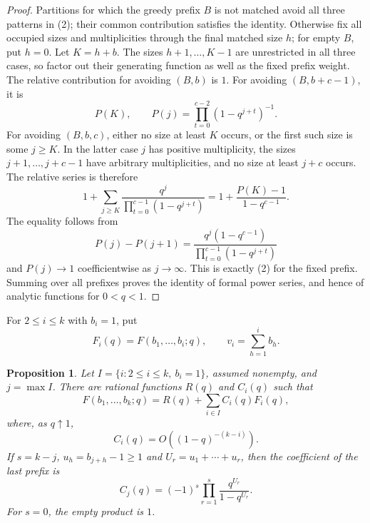\documentclass[11pt,a4paper]{article}
\numberwithin{equation}{section}
\newtheorem{proposition}[theorem]{Proposition}
\theoremstyle{definition}
\theoremstyle{remark}
\begin{document}
\begin{proof}
Partitions for which the greedy prefix $B$ is not matched avoid all
three patterns in (2); their common contribution satisfies the identity.
Otherwise fix all occupied sizes and multiplicities through the final
matched size $h$; for empty $B$, put $h=0$.  Let $K=h+b$.
The sizes $h+1,\ldots,K-1$ are unrestricted in all three cases, so
factor out their generating function as well as the fixed prefix weight.
The relative contribution for avoiding $(B,b)$ is $1$.
For avoiding $(B,b+c-1)$, it is
\[
 P(K),\qquad P(j)=\prod_{t=0}^{c-2}(1-q^{j+t})^{-1}.
\]
For avoiding $(B,b,c)$, either no size at least $K$ occurs, or the
first such size is some $j\ge K$.  In the latter case $j$ has positive
multiplicity, the sizes $j+1,\ldots,j+c-1$ have arbitrary
multiplicities, and no size at least $j+c$ occurs.  The relative series
is therefore
\[
 1+\sum_{j\ge K}
      \frac{q^j}{\prod_{t=0}^{c-1}(1-q^{j+t})}
 =1+\frac{P(K)-1}{1-q^{c-1}}.
\]
The equality follows from
\[
 P(j)-P(j+1)
   =\frac{q^j(1-q^{c-1})}
           {\prod_{t=0}^{c-1}(1-q^{j+t})}
\]
and $P(j)\to1$ coefficientwise as $j\to\infty$.
This is exactly (2) for the fixed prefix.  Summing over all prefixes
proves the identity of formal power series, and hence of analytic
functions for $0<q<1$.
\end{proof}

For $2\le i\le k$ with $b_i=1$, put
\[
 F_i(q)=F(b_1,\ldots,b_i;q),\qquad
 v_i=\sum_{h=1}^i b_h.
\]

\begin{proposition}\label{add47taisho:r47:decomp}
Let $I=\{i:2\le i\le k,\ b_i=1\}$, assumed nonempty, and
$j=\max I$.  There are rational functions $R(q)$ and $C_i(q)$ such that
\[
 F(b_1,\ldots,b_k;q)=R(q)+\sum_{i\in I}C_i(q)F_i(q),              \tag{3}
\]
where, as $q\uparrow1$,
\[
 C_i(q)=O((1-q)^{-(k-i)}).                         \tag{4}
\]
If $s=k-j$, $u_h=b_{j+h}-1\ge1$ and
$U_r=u_1+\cdots+u_r$, then the coefficient of the last prefix is
\[
 C_j(q)=(-1)^s\prod_{r=1}^s\frac{q^{U_r}}{1-q^{U_r}}.          \tag{5}
\]
For $s=0$, the empty product is $1$.
\end{proposition}
\end{document}

